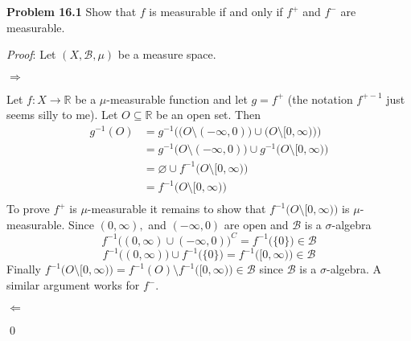 \documentclass[12pt]{article}
\newcommand{\problem}[1]{\hspace{-4 ex} \large \textbf{Problem #1} }
\let\emptyset\varnothing
\renewenvironment{proof}{\hspace{-4 ex} \emph{Proof}:}{\qed}
\newcommand{\RR}{\mathbb{R}}
\newcommand{\BB}{\mathcal{B}}
\begin{document}
\bigbreak
\problem{16.1} Show that $f$ is measurable if and only if $f^+$ and $f^-$ are measurable.
\bigbreak

\begin{proof}
	Let $(X, \BB,\mu)$ be a measure space.
	
	$\Longrightarrow$
	
	Let $f: X \to \RR$ be a $\mu$-measurable function and let $g = f^+$ (the notation $f^{+-1}$ just seems silly to me). Let $O \subseteq \RR$ be an open set. Then 
	\begin{align*}
		g^{-1}(O) & = g^{-1}\Big( \big( O \setminus (-\infty,0) \big) \cup \big( O \setminus [0, \infty) \big) \Big) \\
		& = g^{-1} \big( O \setminus (-\infty,0) \big) \cup g^{-1} \big( O \setminus [0, \infty) \big) \\
		& = \emptyset \cup f^{-1} \big( O \setminus [0, \infty) \big) \\
		& = f^{-1} \big( O \setminus [0, \infty) \big) \\
	\end{align*}
	To prove $f^+$ is $\mu$-measurable it remains to show that $f^{-1} \big( O \setminus [0, \infty) \big)$ is $\mu$-measurable.
	Since $(0, \infty),$ and $(-\infty, 0)$ are open and $\BB$ is a $\sigma$-algebra
	$$
	f^{-1} \big( (0, \infty) \cup (-\infty, 0) \big)^C = f^{-1} \big( \{0\} \big ) \in \BB
	$$
	$$
	f^{-1} \big( (0, \infty) \big) \cup f^{-1} \big( \{0\} \big ) = f^{-1} \big( [0, \infty) \big) \in \BB
	$$
	Finally $f^{-1} \big( O \setminus [0, \infty) \big) = f^{-1}(O) \setminus f^{-1} \big( [0, \infty) \big) \in \BB$ since $\BB$ is a $\sigma$-algebra. A similar argument works for $f^-$.
	
	\bigbreak $\Longleftarrow$
	

\end{proof}
\end{document}
